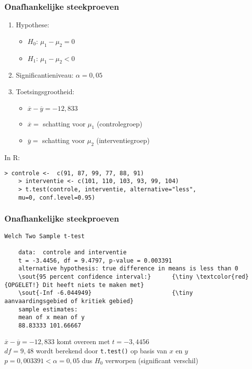 \documentclass[aspectratio=169]{beamer}
\begin{document}
\begin{frame}[fragile]
  \frametitle{Onafhankelijke steekproeven}
  \begin{enumerate}
    \item Hypothese:
    \begin{itemize}
      \item $H_0$: $\mu_1 - \mu_2 = 0$
      \item $H_1$: $\mu_1 - \mu_2 < 0$
    \end{itemize}
    \item Significantieniveau: $\alpha = 0,05$
    \item Toetsingsgrootheid:
    \begin{itemize}
      \item $\overline{x}-\overline{y} = -12,833$
      \item $\overline{x} =$ schatting voor $\mu_1$ (controlegroep)
      \item $\overline{y} =$ schatting voor $\mu_2$ (interventiegroep)
    \end{itemize}
  \end{enumerate}
  \vfill
  In R:
  {\footnotesize
    \begin{Verbatim}[commandchars=\\\{\}]
    > controle <-  c(91, 87, 99, 77, 88, 91)
    > interventie <- c(101, 110, 103, 93, 99, 104)
    > t.test(controle, interventie, alternative="less",
    mu=0, conf.level=0.95)
    \end{Verbatim}
  }
\end{frame}

\begin{frame}[fragile]
  \frametitle{Onafhankelijke steekproeven}

  {\footnotesize
    \begin{Verbatim}[commandchars=\\\{\}]
    Welch Two Sample t-test

    data:  controle and interventie
    t = -3.4456, df = 9.4797, p-value = 0.003391
    alternative hypothesis: true difference in means is less than 0
    \sout{95 percent confidence interval:}      {\tiny \textcolor{red}{OPGELET!} Dit heeft niets te maken met}
    \sout{-Inf -6.044949}                       {\tiny   aanvaardingsgebied of kritiek gebied}
    sample estimates:
    mean of x mean of y
    88.83333 101.66667
    \end{Verbatim}
  }
  \vfill
  $\overline{x}-\overline{y}=-12,833$ komt overeen met $t=-3,4456$\\
  $df=9,48$ wordt berekend door \texttt{t.test()} op basis van $x$ en $y$\\
  $p = 0,003391 < \alpha = 0,05$ dus $H_0$ verworpen (significant verschil)
\end{frame}
\end{document}
